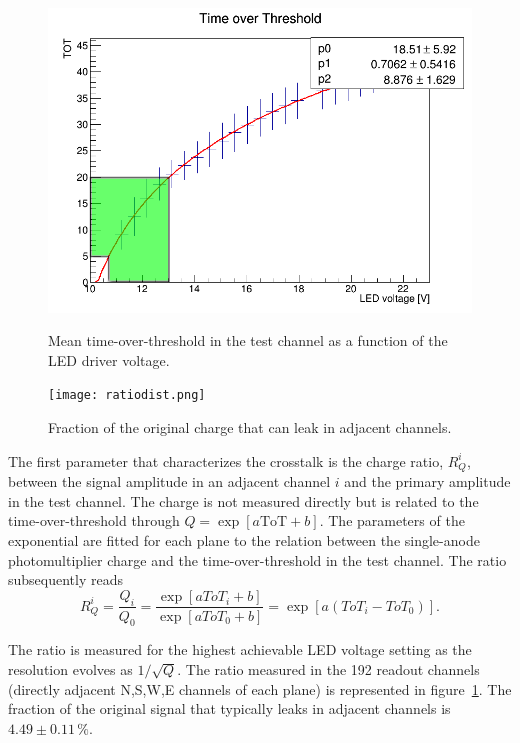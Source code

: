 \documentclass[a4paper,11pt]{article}
\begin{document}
\begin{figure}[htr!]
  \begin{minipage}[b]{.49\textwidth}
   \centering
   \includegraphics[width=\textwidth]{settings.png}
   \caption{Mean time-over-threshold in the test channel as a function of the LED driver voltage.}
   \label{fig:voltage}
  \end{minipage}
  \begin{minipage}[b]{.49\textwidth}
   \centering
   \texttt{[image: ratiodist.png]}
   \caption{Fraction of the original charge that can leak in adjacent channels.}
   \label{fig:ratio_dist}
  \end{minipage}
\end{figure}


The first parameter that characterizes the crosstalk is the charge ratio, $R_Q^i$, between the signal amplitude in an adjacent channel $i$ and the primary amplitude in the test channel. The charge is not measured directly but is related to the time-over-threshold through $Q=\exp[a\mathrm{ToT}+b]$. The parameters of the exponential are fitted for each plane to the relation between the single-anode photomultiplier charge and the time-over-threshold in the test channel. The ratio subsequently reads
\begin{equation}
R_Q^i=\frac{Q_i}{Q_0}=\frac{\exp[aToT_i+b]}{\exp[aToT_0+b]}=\exp\left[a(ToT_i-ToT_0)\right].
\end{equation}

The ratio is measured for the highest achievable LED voltage setting as the resolution evolves as $1/\sqrt{Q}$. The ratio measured in the 192 readout channels (directly adjacent N,S,W,E channels of each plane) is represented in figure~\ref{fig:ratio_dist}. The fraction of the original signal that typically leaks in adjacent channels is $4.49\pm0.11\,\%$.
\end{document}
